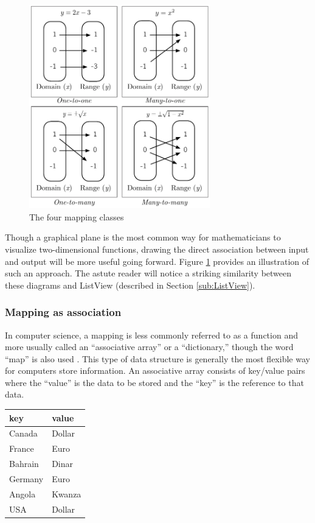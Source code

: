 \begin{figure}[h]
\centering
	\includegraphics[width=0.7\textwidth]{figures/types_of_mapping}
\caption{The four mapping classes}
\label{fig:types_of_mapping}
\end{figure}

Though a graphical plane is the most common way for mathematicians to visualize two-dimensional functions, drawing the direct association between input and output will be more useful going forward. Figure \ref{fig:types_of_mapping} provides an illustration of such an approach. The astute reader will notice a striking similarity between these diagrams and ListView (described in Section \ref{sub:ListView}).  


	\subsubsection{Mapping as association}

In computer science, a mapping is less commonly referred to as a function and more usually called an ``associative array'' or a ``dictionary,'' though the word ``map'' is also used \cite{data_structures}. This type of data structure is generally the most flexible way for computers store information. An associative array consists of key/value pairs where the ``value'' is the data to be stored and the ``key'' is the reference to that data. 

\begin{table}[!h]
	\centering
	\label{tab:key_value_pairs}
	\begin{tabular}{l l}
		\hline\hline
		key&value\\
		\hline
		Canada&Dollar\\
		France&Euro\\
		Bahrain&Dinar\\
		Germany&Euro\\
		Angola&Kwanza\\
		USA&Dollar\\
		\hline
	\end{tabular}
\end{table}

